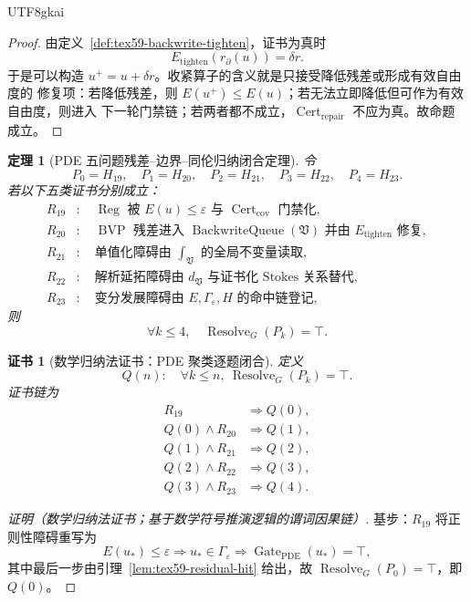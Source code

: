 \documentclass[12pt]{article}
\newtheorem{theorem}{定理}[section]
\newtheorem{Certificate}{证书}[section]
\newcommand{\Vsys}{\mathfrak V}
\newcommand{\eps}{\varepsilon}
\DeclareMathOperator{\Cert}{Cert}
\DeclareMathOperator{\Resolve}{Resolve}
\DeclareMathOperator{\Gate}{Gate}
\DeclareMathOperator{\BackwriteQueue}{BackwriteQueue}
\DeclareMathOperator{\BVP}{BVP}
\DeclareMathOperator{\PDE}{PDE}
\DeclareMathOperator{\Reg}{Reg}
\begin{document}
\begin{CJK*}{UTF8}{gkai}
\begin{proof}
由定义~\ref{def:tex59-backwrite-tighten}，证书为真时
\[
  E_{\mathrm{tighten}}(r_{\partial}(u))=\delta r.
\]
于是可以构造 \(u^+=u+\delta r\)。收紧算子的含义就是只接受降低残差或形成有效自由度的
修复项：若降低残差，则 \(E(u^+)\le E(u)\)；若无法立即降低但可作为有效自由度，则进入
下一轮门禁链；若两者都不成立，\(\Cert_{\mathrm{repair}}\) 不应为真。故命题成立。
\end{proof}

\begin{theorem}[PDE 五问题残差--边界--同伦归纳闭合定理]
\label{thm:tex59-pde-cluster-induction}
令
\[
  P_0=H_{19},\quad P_1=H_{20},\quad P_2=H_{21},\quad P_3=H_{22},\quad P_4=H_{23}.
\]
若以下五类证书分别成立：
\[
\begin{aligned}
  R_{19}&:\quad \Reg\text{ 被 }E(u)\le\eps\text{ 与 }\Cert_{\mathrm{cov}}\text{ 门禁化},\\
  R_{20}&:\quad \BVP\text{ 残差进入 }\BackwriteQueue(\Vsys)\text{ 并由 }E_{\mathrm{tighten}}\text{ 修复},\\
  R_{21}&:\quad \text{单值化障碍由 }\int_{\Vsys}\text{ 的全局不变量读取},\\
  R_{22}&:\quad \text{解析延拓障碍由 }d_{\Vsys}\text{ 与证书化 Stokes 关系替代},\\
  R_{23}&:\quad \text{变分发展障碍由 }E,\Gamma_{\eps},H\text{ 的命中链登记},
\end{aligned}
\]
则
\[
  \forall k\le4,\quad \Resolve_G(P_k)=\top.
\]
\end{theorem}

\begin{Certificate}[数学归纳法证书：PDE 聚类逐题闭合]
\label{cert:tex59-pde-cluster-induction}
定义
\[
  Q(n):\quad \forall k\le n,\ \Resolve_G(P_k)=\top.
\]
证书链为
\[
\begin{aligned}
  R_{19}&\Rightarrow Q(0),\\
  Q(0)\wedge R_{20}&\Rightarrow Q(1),\\
  Q(1)\wedge R_{21}&\Rightarrow Q(2),\\
  Q(2)\wedge R_{22}&\Rightarrow Q(3),\\
  Q(3)\wedge R_{23}&\Rightarrow Q(4).
\end{aligned}
\]
\end{Certificate}

\begin{proof}[证明（数学归纳法证书；基于数学符号推演逻辑的谓词因果链）]
基步：\(R_{19}\) 将正则性障碍重写为
\[
  E(u_\ast)\le\eps
  \Longrightarrow
  u_\ast\in\Gamma_{\eps}
  \Longrightarrow
  \Gate_{\PDE}(u_\ast)=\top,
\]
其中最后一步由引理~\ref{lem:tex59-residual-hit} 给出，故 \(\Resolve_G(P_0)=\top\)，即
\(Q(0)\)。


\end{proof}
\end{CJK*}
\end{document}
